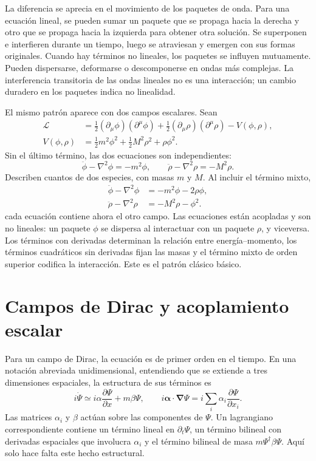 La diferencia se aprecia en el movimiento de los paquetes de onda. Para una ecuación lineal, se pueden sumar un paquete que se propaga hacia la derecha y otro que se propaga hacia la izquierda para obtener otra solución. Se superponen e interfieren durante un tiempo, luego se atraviesan y emergen con sus formas originales. Cuando hay términos no lineales, los paquetes se influyen mutuamente. Pueden dispersarse, deformarse o descomponerse en ondas más complejas. La interferencia transitoria de las ondas lineales no es una interacción; un cambio duradero en los paquetes indica no linealidad.

El mismo patrón aparece con dos campos escalares. Sean
\begin{align}
\mathcal L
&=
\frac12(\partial_\mu\phi)(\partial^\mu\phi)
+\frac12(\partial_\mu\rho)(\partial^\mu\rho)
-V(\phi,\rho),
\\
V(\phi,\rho)
&=
\frac12m^2\phi^2+\frac12M^2\rho^2+\rho\phi^2.
\end{align}
Sin el último término, las dos ecuaciones son independientes:
\begin{equation}
\ddot\phi-\nabla^2\phi=-m^2\phi,
\qquad
\ddot\rho-\nabla^2\rho=-M^2\rho.
\end{equation}
Describen cuantos de dos especies, con masas \(m\) y \(M\). Al incluir el término mixto,
\begin{align}
\ddot\phi-\nabla^2\phi&=-m^2\phi-2\rho\phi,
\\
\ddot\rho-\nabla^2\rho&=-M^2\rho-\phi^2.
\end{align}
cada ecuación contiene ahora el otro campo. Las ecuaciones están acopladas y son no lineales: un paquete \(\phi\) se dispersa al interactuar con un paquete \(\rho\), y viceversa. Los términos con derivadas determinan la relación entre energía--momento, los términos cuadráticos sin derivadas fijan las masas y el término mixto de orden superior codifica la interacción. Este es el patrón clásico básico.

\section{Campos de Dirac y acoplamiento escalar}

Para un campo de Dirac, la ecuación es de primer orden en el tiempo. En una notación abreviada unidimensional, entendiendo que se extiende a tres dimensiones espaciales, la estructura de sus términos es
\begin{equation}
i\dot\Psi
\simeq
i\alpha\frac{\partial\Psi}{\partial x}+m\beta\Psi,
\qquad
i\boldsymbol\alpha\cdot\boldsymbol\nabla\Psi
=i\sum_i\alpha_i\frac{\partial\Psi}{\partial x_i}.
\end{equation}
Las matrices \(\alpha_i\) y \(\beta\) actúan sobre las componentes de \(\Psi\). Un lagrangiano correspondiente contiene un término lineal en \(\partial_t\Psi\), un término bilineal con derivadas espaciales que involucra \(\alpha_i\) y el término bilineal de masa \(m\Psi^\dagger\beta\Psi\). Aquí solo hace falta este hecho estructural.

